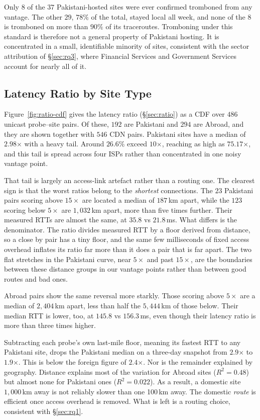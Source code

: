 \documentclass[sigconf,anonymous,10pt]{acmart}
\begin{document}
Only $8$ of the $37$ Pakistani-hosted sites were ever confirmed tromboned from any vantage. The other $29$, $78\%$ of the total, stayed local all week, and none of the $8$ is tromboned on more than $90\%$ of its traceroutes. Tromboning under this standard is therefore not a general property of Pakistani hosting. It is concentrated in a small, identifiable minority of sites, consistent with the sector attribution of \S\ref{sec:rq3}, where Financial Services and Government Services account for nearly all of it.


\subsection{Latency Ratio by Site Type}
\label{sec:prelim-ratio}
Figure~\ref{fig:ratio-cdf} gives the latency ratio (\S\ref{sec:ratio}) as a CDF over $486$ unicast probe--site pairs. Of these, $192$ are Pakistani and $294$ are Abroad, and they are shown together with $546$ CDN pairs. Pakistani sites have a median of $2.98$$\times$ with a heavy tail. Around $26.6$\% exceed $10$$\times$, reaching as high as $75.17$$\times$, and this tail is spread across four ISPs rather than concentrated in one noisy vantage point.

That tail is largely an access-link artefact rather than a routing one. The clearest sign is that the worst ratios belong to the \emph{shortest} connections. The $23$ Pakistani pairs scoring above $15\times$ are located a median of $187$\,km apart, while the $123$ scoring below $5\times$ are $1{,}032$\,km apart, more than five times further. Their measured RTTs are almost the same, at $35.8$ vs $21.8$\,ms. What differs is the denominator. The ratio divides measured RTT by a floor derived from distance, so a close by pair has a tiny floor, and the same few milliseconds of fixed access overhead inflates its ratio far more than it does a pair that is far apart. The two flat stretches in the Pakistani curve, near $5\times$ and past $15\times$, are the boundaries between these distance groups in our vantage points rather than between good routes and bad ones.

Abroad pairs show the same reversal more starkly. Those scoring above $5\times$ are a median of $2{,}404$\,km apart, less than half the $5{,}444$\,km of those below. Their median RTT is lower, too, at $145.8$ vs $156.3$\,ms, even though their latency ratio is more than three times higher.

Subtracting each probe's own last-mile floor, meaning its fastest RTT to any Pakistani site, drops the Pakistani median on a three-day snapshot from $2.9$$\times$ to $1.9$$\times$. This is below the foreign figure of $2.4$$\times$. Nor is the remainder explained by geography. Distance explains most of the variation for Abroad sites ($R^2=0.48$) but almost none for Pakistani ones ($R^2=0.022$). As a result, a domestic site $1,000$\,km away is not reliably slower than one 100\,km away. The domestic \emph{route} is efficient once access overhead is removed. What is left is a routing choice, consistent with \S\ref{sec:rq1}.
\end{document}
